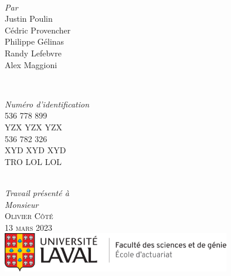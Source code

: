 \begin{titlepage}
\HRule \\[2cm]
\begin{minipage}{0.4\textwidth}
    \begin{flushleft} \large
    \emph{Par}\\
        Justin Poulin\\
        Cédric Provencher\\
        Philippe Gélinas\\
        Randy Lefebvre\\
        Alex Maggioni
    \end{flushleft}
\end{minipage}
~%
\begin{minipage}{0.4\textwidth}
    \begin{flushright} \large
    \emph{Numéro d'identification}\\
        536 778 899\\
        YZX YZX YZX\\
        536 782 326\\
        XYD XYD XYD\\
        TRO LOL LOL
    \end{flushright}
\end{minipage} \\[1.0cm]
\emph{Travail présenté à} \\
\emph{Monsieur} \\[0.1cm]
\textsc{\Large Olivier \textsc{Côté}}\\[1.0cm]
\textsc{\large 13 mars 2023}\\[1cm] %

\includegraphics[width = 10cm]{ul-actuariat}\\[1.5cm]
 
\vfill %

\end{titlepage}
%